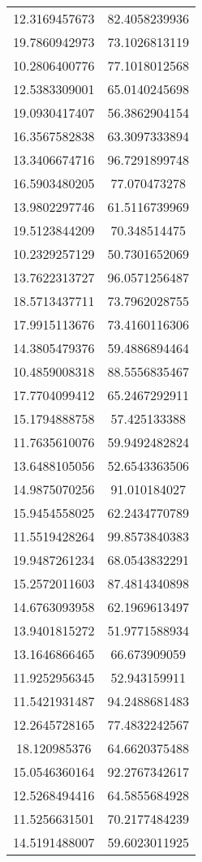 \begin{table}
\begin{tabular}{cc}
12.3169457673 & 82.4058239936 \\
19.7860942973 & 73.1026813119 \\
10.2806400776 & 77.1018012568 \\
12.5383309001 & 65.0140245698 \\
19.0930417407 & 56.3862904154 \\
16.3567582838 & 63.3097333894 \\
13.3406674716 & 96.7291899748 \\
16.5903480205 & 77.070473278 \\
13.9802297746 & 61.5116739969 \\
19.5123844209 & 70.348514475 \\
10.2329257129 & 50.7301652069 \\
13.7622313727 & 96.0571256487 \\
18.5713437711 & 73.7962028755 \\
17.9915113676 & 73.4160116306 \\
14.3805479376 & 59.4886894464 \\
10.4859008318 & 88.5556835467 \\
17.7704099412 & 65.2467292911 \\
15.1794888758 & 57.425133388 \\
11.7635610076 & 59.9492482824 \\
13.6488105056 & 52.6543363506 \\
14.9875070256 & 91.010184027 \\
15.9454558025 & 62.2434770789 \\
11.5519428264 & 99.8573840383 \\
19.9487261234 & 68.0543832291 \\
15.2572011603 & 87.4814340898 \\
14.6763093958 & 62.1969613497 \\
13.9401815272 & 51.9771588934 \\
13.1646866465 & 66.673909059 \\
11.9252956345 & 52.943159911 \\
11.5421931487 & 94.2488681483 \\
12.2645728165 & 77.4832242567 \\
18.120985376 & 64.6620375488 \\
15.0546360164 & 92.2767342617 \\
12.5268494416 & 64.5855684928 \\
11.5256631501 & 70.2177484239 \\
14.5191488007 & 59.6023011925 \\

\end{tabular}
\end{table}
